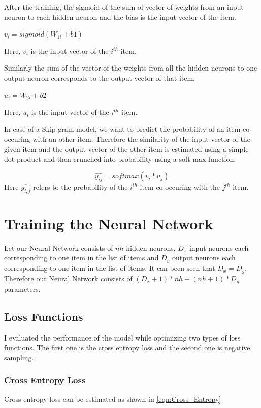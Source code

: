 After the training, the sigmoid of the sum of vector of weights from an input neuron to each hidden neuron and the bias is the input vector of the item. 
\begin{center}
$v_i=sigmoid(W_{1i}+b1)$
\end{center}
Here, $v_i$ is the input vector of the $i^{th}$ item. 

Similarly the sum of the vector of the weights from all the hidden neurons to one output neuron corresponds to the output vector of that item.
\begin{center}
$u_i=W_{2i}+b2$
\end{center}

Here, $u_i$ is the input vector of the $i^{th}$ item. 

In case of a Skip-gram model, we want to predict the probability of an item co-occuring with an other item. Therefore the similarity of the input vector of the given item and the output vector of the other item is estimated using a simple dot product and then crunched into probability using a soft-max function.

\begin{equation}
\hat{y_{ij}}=softmax(v_i*u_j)
\end{equation}
Here $\hat{y_{i,j}}$ refers to the probability of the $i^{th}$ item co-occuring with the  $j^{th}$ item.

\section{Training the Neural Network}
Let our Neural Network consists of $nh$ hidden neurons, $D_x$ input neurons each corresponding to one item in the list of items and $D_y$ output neurons each corresponding to one item in the list of items. It can been seen that $D_x=D_y$. Therefore our Neural Network consists of $(D_x+1)*nh + (nh+1)*D_y$ parameters.

\subsection{Loss Functions}
I evaluated the performance of the model while optimizing two types of loss functions. The first one is the cross entropy loss and the second one is negative sampling. 
\subsubsection{Cross Entropy Loss}
Cross entropy loss can be estimated as shown in \ref{eqn:Cross_Entropy}

